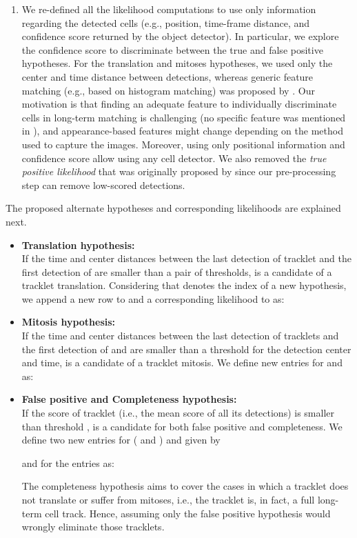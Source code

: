 \documentclass{article}
\begin{document}
\begin{enumerate}
    \item We re-defined all the likelihood computations to use only information regarding the detected cells (e.g., position, time-frame distance, and confidence score returned by the object detector). In particular, we explore the confidence score to discriminate between the true and false positive hypotheses. For the translation and mitoses hypotheses, we used only the center and time distance between detections, whereas generic feature matching (e.g., based on histogram matching) was proposed by \cite{bise}. Our motivation is that finding an adequate feature to individually discriminate cells in long-term matching is challenging (no specific feature was mentioned in \cite{bise}), and appearance-based features might change depending on the method used to capture the images. Moreover, using only positional information and confidence score allow using any cell detector. We also removed the \textit{true positive likelihood} that was originally proposed by \cite{bise} since our pre-processing step can remove low-scored detections.
\end{enumerate}

The proposed alternate hypotheses and corresponding likelihoods are explained next.
\begin{itemize}
    \item \textbf{Translation hypothesis:}\\
    If the time and center distances between the last detection of tracklet  and the first detection of  are smaller than a pair of thresholds,  is a candidate of a tracklet translation. Considering that  denotes the index of a new hypothesis, we append a new row to  and a corresponding likelihood to  as:
    
    
    \item \textbf{Mitosis hypothesis:}\\
    If the time and center distances between the last detection of tracklets  and the first detection of  and  are smaller than a threshold for the detection center and time,  is a candidate of a tracklet mitosis. We define new entries for  and  as:
    
    
    \item \textbf{False positive and Completeness hypothesis:}\\
    If the score of tracklet  (i.e., the mean score of all its detections) is smaller than threshold ,  is a candidate for both false positive and completeness. We define two new entries for  ( and ) and  given by
    
    and for the  entries as:
    
    
    The completeness hypothesis aims to cover the cases in which a tracklet does not translate or suffer from mitoses, i.e., the tracklet is, in fact, a full long-term cell track. Hence, assuming only the false positive hypothesis would wrongly eliminate those tracklets.
\end{itemize}
\end{document}
